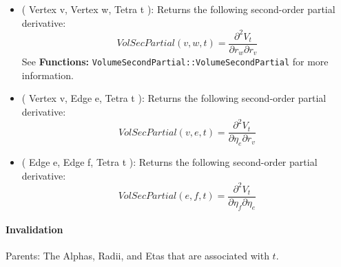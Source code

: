 \begin{itemize}
\item ( Vertex v, Vertex w, Tetra t ): Returns the following second-order
partial derivative: 
\begin{equation*}
VolSecPartial(v,w,t)=\frac{\partial ^{2}V_{t}}{\partial r_{w}\partial r_{v}}
\end{equation*}%
See \textbf{Functions: }\texttt{VolumeSecondPartial::VolumeSecondPartial}
for more information.

\item ( Vertex v, Edge e, Tetra t ): Returns the following second-order
partial derivative: 
\begin{equation*}
VolSecPartial(v,e,t)=\frac{\partial ^{2}V_{t}}{\partial \eta _{e}\partial
r_{v}}
\end{equation*}

\item ( Edge e, Edge f, Tetra t ): Returns the following second-order
partial derivative: 
\begin{equation*}
VolSecPartial(e,f,t)=\frac{\partial ^{2}V_{t}}{\partial \eta _{f}\partial
\eta _{e}}
\end{equation*}
\end{itemize}

\paragraph{Invalidation}

Parents: The Alphas, Radii, and Etas that are associated with $t$.

\bigskip
